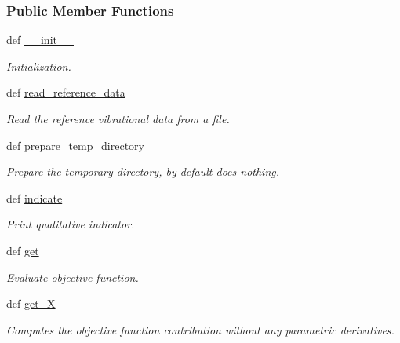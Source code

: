 \subsubsection*{Public Member Functions}
\begin{DoxyCompactItemize}
\item 
def \hyperlink{classforcebalance_1_1vibration_1_1Vibration_af449471c321f81318a76c327a9767cd9}{\-\_\-\-\_\-init\-\_\-\-\_\-}
\begin{DoxyCompactList}\small\item\em Initialization. \end{DoxyCompactList}\item 
def \hyperlink{classforcebalance_1_1vibration_1_1Vibration_ad3fc1fdf6452b11933d234b46b07071d}{read\-\_\-reference\-\_\-data}
\begin{DoxyCompactList}\small\item\em Read the reference vibrational data from a file. \end{DoxyCompactList}\item 
def \hyperlink{classforcebalance_1_1vibration_1_1Vibration_ad5a5b08f621b291d9d7c1af4c1210911}{prepare\-\_\-temp\-\_\-directory}
\begin{DoxyCompactList}\small\item\em Prepare the temporary directory, by default does nothing. \end{DoxyCompactList}\item 
def \hyperlink{classforcebalance_1_1vibration_1_1Vibration_a1f13ce8796e3d089c9a361f43844bb98}{indicate}
\begin{DoxyCompactList}\small\item\em Print qualitative indicator. \end{DoxyCompactList}\item 
def \hyperlink{classforcebalance_1_1vibration_1_1Vibration_a3b20f6a97f3aba4f704056ed12a999a5}{get}
\begin{DoxyCompactList}\small\item\em Evaluate objective function. \end{DoxyCompactList}\item 
def \hyperlink{classforcebalance_1_1target_1_1Target_a606dd136f195c267c05a2455405e5949}{get\-\_\-\-X}
\begin{DoxyCompactList}\small\item\em Computes the objective function contribution without any parametric derivatives. \end{DoxyCompactList}\item 

\end{DoxyCompactItemize}
